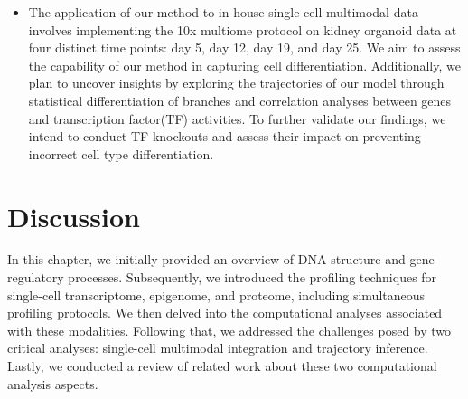 \begin{itemize}
	\item The application of our method to in-house single-cell multimodal data involves implementing the 10x multiome protocol on kidney organoid data at four distinct time points: day 5, day 12, day 19, and day 25. We aim to assess the capability of our method in capturing cell differentiation. Additionally, we plan to uncover insights by exploring the trajectories of our model through statistical differentiation of branches and correlation analyses between genes and transcription factor(TF) activities. To further validate our findings, we intend to conduct TF knockouts and assess their impact on preventing incorrect cell type differentiation.
	
\end{itemize}


\section{Discussion}
\label{background:Discussion}
In this chapter, we initially provided an overview of DNA structure and gene regulatory processes. Subsequently, we introduced the profiling techniques for single-cell transcriptome, epigenome, and proteome, including simultaneous profiling protocols. We then delved into the computational analyses associated with these modalities. Following that, we addressed the challenges posed by two critical analyses: single-cell multimodal integration and trajectory inference. Lastly, we conducted a review of related work about these two computational analysis aspects.


